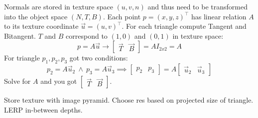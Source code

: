 \begin{theorem}
  Normals are stored in texture space \((u, v, n)\) and thus need to be transformed into the object space \((N, T, B)\).
  Each point \(p = (x, y, z)^\top\) has linear relation \(A\) to its texture coordinate \(\vec{u} = (u, v)^\top\).
  For each triangle compute Tangent and Bitangent.
  \(T\) and \(B\) correspond to \((1, 0)\) and \((0, 1)\) in texture space:
  \[p = A \vec{u} \to \begin{bmatrix}
    \vec{T} & \vec{B}
  \end{bmatrix} = A I_{2 x 2} = A\]
  For triangle \(p_1, p_2, p_3\) got two conditions:
  \[p_2 = A \vec{u}_2 \ \land \ p_3 = A \vec{u}_3 \implies \begin{bmatrix}
    p_2 & p_3
  \end{bmatrix} = A \begin{bmatrix}
    \vec{u}_2 & \vec{u}_3
  \end{bmatrix}\]
  Solve for \(A\) and you got \(\begin{bmatrix}
    \vec{T} & \vec{B}
  \end{bmatrix}\).
\end{theorem}

\begin{definition}
  Store texture with image pyramid. Choose res based on projected size of triangle. LERP in-between depths.
\end{definition}
